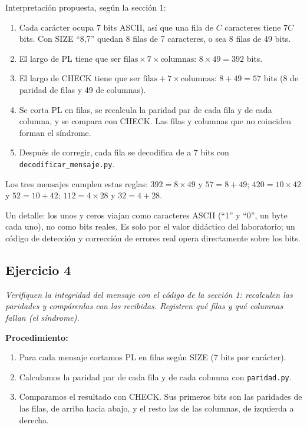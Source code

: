 \documentclass[11pt,a4paper]{article}
\begin{document}
Interpretación propuesta, según la sección 1:

\begin{enumerate}
  \item Cada carácter ocupa 7 bits ASCII, así que una fila de $C$ caracteres tiene $7C$ bits. Con SIZE ``8,7'' quedan 8 filas de 7 caracteres, o sea 8 filas de 49 bits.
  \item El largo de PL tiene que ser $\mbox{filas} \times 7 \times \mbox{columnas}$: $8 \times 49 = 392$ bits.
  \item El largo de CHECK tiene que ser $\mbox{filas} + 7 \times \mbox{columnas}$: $8 + 49 = 57$ bits (8 de paridad de filas y 49 de columnas).
  \item Se corta PL en filas, se recalcula la paridad par de cada fila y de cada columna, y se compara con CHECK. Las filas y columnas que no coinciden forman el síndrome.
  \item Después de corregir, cada fila se decodifica de a 7 bits con \texttt{decodificar\_mensaje.py}.
\end{enumerate}

Los tres mensajes cumplen estas reglas: $392 = 8 \times 49$ y $57 = 8 + 49$; $420 = 10 \times 42$ y $52 = 10 + 42$; $112 = 4 \times 28$ y $32 = 4 + 28$.

Un detalle: los unos y ceros viajan como caracteres ASCII (``1'' y ``0'', un byte cada uno), no como bits reales. Es solo por el valor didáctico del laboratorio; un código de detección y corrección de errores real opera directamente sobre los bits.

\subsection*{Ejercicio 4}

\textit{Verifiquen la integridad del mensaje con el código de la sección 1: recalculen las paridades y compárenlas con las recibidas. Registren qué filas y qué columnas fallan (el síndrome).}

\medskip

\noindent\textbf{Procedimiento:}
\begin{enumerate}
  \item Para cada mensaje cortamos PL en filas según SIZE (7 bits por carácter).
  \item Calculamos la paridad par de cada fila y de cada columna con \texttt{paridad.py}.
  \item Comparamos el resultado con CHECK. Sus primeros bits son las paridades de las filas, de arriba hacia abajo, y el resto las de las columnas, de izquierda a derecha.
\end{enumerate}
\end{document}
